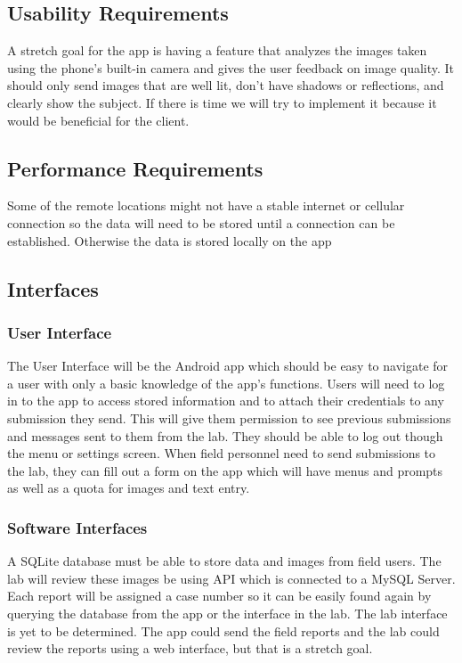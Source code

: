 \documentclass[onecolumn, draftclsnofoot,10pt, compsoc]{IEEEtran}
\begin{document}
\subsection{Usability Requirements}
A stretch goal for the app is having a feature that analyzes the images taken using the phone's built-in camera and gives the user feedback on image quality. 
It should only send images that are well lit, don’t have shadows or reflections, and clearly show the subject. 
If there is time we will try to implement it because it would be beneficial for the client. 

\subsection{Performance Requirements}
Some of the remote locations might not have a stable internet or cellular connection so the data will need to be stored until a connection can be established. Otherwise the data is stored locally on the app 

\subsection{Interfaces}
\subsubsection{User Interface}
The User Interface will be the Android app which should be easy to navigate for a user with only a basic knowledge of the app's functions. 
\newline
Users will need to log in to the app to access stored information and to attach their credentials to any submission they send. 
This will give them permission to see previous submissions and messages sent to them from the lab. They should be able to log out though the menu or settings screen. 
When field personnel need to send submissions to the lab, they can fill out a form on the app which will have menus and prompts as well as a quota for images and text entry.

\subsubsection{Software Interfaces}
A SQLite database must be able to store data and images from field users.
The lab will review these images be using API which is connected to a MySQL Server. 
Each report will be assigned a case number so it can be easily found again by querying the database from the app or the interface in the lab. 
The lab interface is yet to be determined. 
The app could send the field reports and the lab could review the reports using  a web interface, but that is a stretch goal. 
\end{document}
